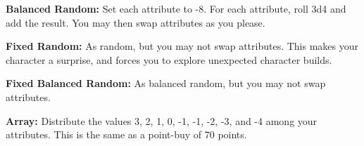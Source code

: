 \begin{multicols*}{2}
    \textbf{Balanced Random:} Set each attribute to -8. For each attribute,
    roll 3d4 and add the result. You may then swap attributes as you please.

    \textbf{Fixed Random:} As random, but you may not swap attributes. This
    makes your character a surprise, and forces you to explore unexpected
    character builds.

    \textbf{Fixed Balanced Random:} As balanced random, but you may not swap
    attributes.

    \textbf{Array:} Distribute the values 3, 2, 1, 0, -1, -1, -2, -3, and -4
    among your attributes. This is the same as a point-buy of 70 points.

\end{multicols*}




%

